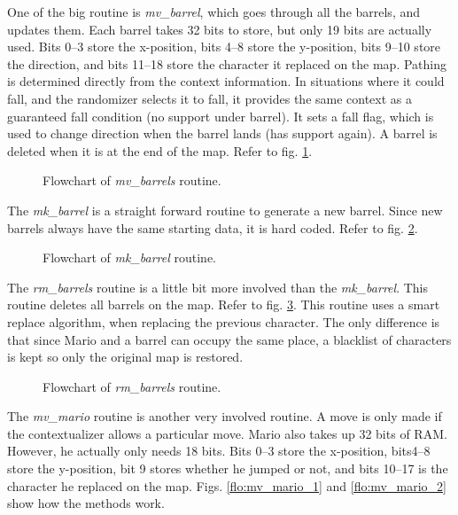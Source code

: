 \documentclass[letterpaper,10pt]{article}
\begin{document}
    One of the big routine is \textit{mv\_barrel}, which goes through all the
    barrels, and updates them. Each barrel takes 32 bits to store, but only 19
    bits are actually used. Bits 0--3 store the x-position, bits 4--8 store
    the y-position, bits 9--10 store the direction, and bits 11--18 store the
    character it replaced on the map. Pathing is determined directly from
    the context information. In situations where it could fall, and the randomizer
    selects it to fall, it provides the same context as a guaranteed fall
    condition (no support under barrel). It sets a fall flag, which is used to
    change direction when the barrel lands (has support again). A barrel is
    deleted when it is at the end of the map. Refer to fig. \ref{flo:mv_barrels}.

    \begin{figure}[hp]
        
        \caption{Flowchart of \textit{mv\_barrels} routine.}
        \label{flo:mv_barrels}
    \end{figure}

    The \textit{mk\_barrel} is a straight forward routine to generate a new
    barrel. Since new barrels always have the same starting data, it is hard
    coded. Refer to fig. \ref{flo:mk_barrel}.

    \begin{figure}[hp]
        
        \caption{Flowchart of \textit{mk\_barrel} routine.}
        \label{flo:mk_barrel}
    \end{figure}

    The \textit{rm\_barrels} routine is a little bit more involved than the
    \textit{mk\_barrel}. This routine deletes all barrels on the map. Refer to
    fig. \ref{flo:rm_barrels}. This routine uses a smart replace algorithm, when
    replacing the previous character. The only difference is that since Mario
    and a barrel can occupy the same place, a blacklist of characters is kept
    so only the original map is restored.

    \begin{figure}[hp]
        
        \caption{Flowchart of \textit{rm\_barrels} routine.}
        \label{flo:rm_barrels}
    \end{figure}

    The \textit{mv\_mario} routine is another very involved routine. A move is 
    only made if the contextualizer allows a particular move. Mario also takes
    up 32 bits of RAM. However, he actually only needs 18 bits. Bits 0--3 store
    the x-position, bits4--8 store the y-position, bit 9 stores whether he
    jumped or not, and bits 10--17 is the character he replaced on the map.
    Figs. \ref{flo:mv_mario_1} and \ref{flo:mv_mario_2} show how the methods
    work.
\end{document}
